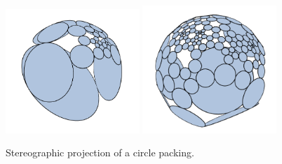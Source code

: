 \documentclass[a4paper,UKenglish]{lipics-v2016}
\begin{document}
  \begin{figure}[ht]
    \centering
      \includegraphics[width = 0.45\textwidth]{figures/3D.png}
      \includegraphics[width = 0.45\textwidth]{figures/3D_2.png}
    \caption{Stereographic projection of a circle packing.}
    \label{fig:3D}
  \end{figure}
\end{document}

